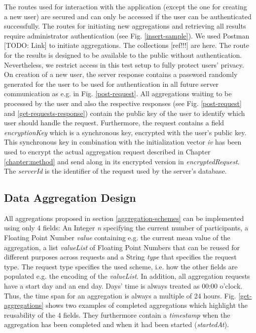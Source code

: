 The routes used for interaction with the application (except the one for creating a new user) are secured and can only be accessed if the user can be authenticated successfully. The routes for initiating new aggregations and retrieving all results require administrator authentication (see Fig. \ref{insert-sample}). We used Postman [TODO: Link] to initiate aggregations. The collections [ref!!!] are here. The route for the results is designed to be available to the public without authentication. Nevertheless, we restrict access in this test setup to fully protect users' privacy.\\
On creation of a new user, the server response contains a password randomly generated for the user to be used for authentication in all future server communication as e.g. in Fig. \ref{post-request}. All aggregations waiting to be processed by the user and also the respective responses (see Fig. \ref{post-request} and \ref{get-requests-response}) contain the public key of the user to identify which user should handle the request. Furthermore, the request contains a field \textit{encryptionKey} which is a synchronous key, encrypted with the user's public key. This synchronous key in combination with the initialization vector \textit{iv} has been used to encrypt the actual aggregation request described in Chapter \ref{chapter:method} and send along in its encrypted version in \textit{encryptedRequest}. The \textit{serverId} is the identifier of the request used by the server's database.


\subsection{Data Aggregation Design}\label{data-aggregation-design}
All aggregations proposed in section \ref{aggregation-schemes} can be implemented using only 4 fields: An Integer \textit{n} specifying the current number of participants, a Floating Point Number \textit{value} containing e.g. the current mean value of the aggregation, a list \textit{valueList} of Floating Point Numbers that can be reused for different purposes across requests and a String \textit{type} that specifies the request type. The request type specifies the used scheme, i.e. how the other fields are populated e.g. the encoding of the \textit{valueList}. In addition, all aggregation requests have a start day and an end day. Days' time is always treated as 00:00 o'clock. Thus, the time span for an aggregation is always a multiple of 24 hours. Fig. \ref{get-aggregations} shows two examples of completed aggregations which highlight the reusability of the 4 fields. They furthermore contain a \textit{timestamp} when the aggregation has been completed and when it had been started (\textit{startedAt}).\\

